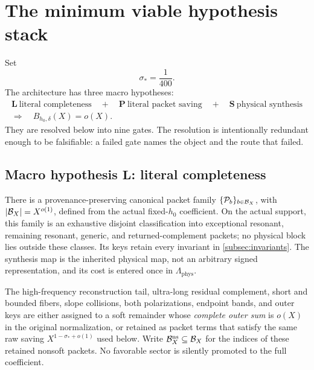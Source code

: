 \section{The minimum viable hypothesis stack}
\label{sec:hypotheses}

Set
\[
\sigma_*=\frac1{400}.
\]
The architecture has three macro hypotheses:
\[
\begin{gathered}
\boxed{\mathbf L\ \text{literal completeness}}
\quad+\quad
\boxed{\mathbf P\ \text{literal packet saving}}
\quad+\quad
\boxed{\mathbf S\ \text{physical synthesis}}\\
\Longrightarrow\quad B_{h_0,\delta}(X)=o(X).
\end{gathered}
\]
They are resolved below into nine gates.  The resolution is
intentionally redundant enough to be falsifiable: a failed gate names
the object and the route that failed.

\subsection{Macro hypothesis
\texorpdfstring{\(\mathbf L\)}{L}: literal completeness}

\begin{hypothesis}
\label{hyp:canonical-synthesis}
There is a provenance-preserving canonical packet family
\(\{\mathcal P_b\}_{b\in\mathcal B_X}\), with
\(|\mathcal B_X|=X^{o(1)}\), defined from the actual fixed-\(h_0\) coefficient.
On the actual support, this family is an exhaustive disjoint
classification into exceptional resonant, remaining resonant,
generic, and returned-complement packets; no physical block lies
outside these classes.
Its keys retain every invariant in
\cref{subsec:invariants}.  The synthesis map is the inherited physical
map, not an arbitrary signed representation, and its cost is entered
once in \(\Lambda_{\mathrm{phys}}\).
\end{hypothesis}

\begin{hypothesis}
\label{hyp:high}
The high-frequency reconstruction tail, ultra-long residual
complement, short and bounded fibers, slope collisions, both
polarizations, endpoint bands, and outer keys are either
assigned to a soft remainder whose \emph{complete outer sum} is
\(o(X)\) in the original normalization, or retained as packet terms
that satisfy the same raw saving \(X^{1-\sigma_*+o(1)}\) used below.
Write \(\mathcal B_X^{\mathrm{ns}}\subseteq\mathcal B_X\) for the indices of these
retained nonsoft packets.
No favorable sector is silently promoted to the full coefficient.
\end{hypothesis}

